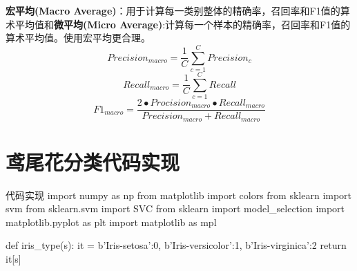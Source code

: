 \documentclass[openbib]{article}
\begin{document}
\textbf{宏平均(Macro Average)}：用于计算每一类别整体的精确率，召回率和F1值的算术平均值和\textbf{微平均(Micro Average)}:计算每一个样本的精确率，召回率和F1值的算术平均值。使用宏平均更合理。
$$Precision_{macro}=\frac{1}{C}\sum_{c=1}^{C}Precision_c$$
$$Recall_{macro}=\frac{1}{C}\sum_{c=1}^{C}Recall$$
$$F1_{macro}=\frac{2\bullet Procision_{macro}\bullet Recall_{macro}}{Precision_{macro}+Recall_{macro}}$$

\section{鸢尾花分类代码实现}
\begin{Python}{代码实现}
import numpy as np
from matplotlib import colors
from sklearn import svm
from sklearn.svm import SVC
from sklearn import model_selection
import matplotlib.pyplot as plt
import matplotlib as mpl

def iris_type(s):
	it = {b'Iris-setosa':0, b'Iris-versicolor':1, b'Iris-virginica':2}
	return it[s]


\end{Python}
\end{document}
